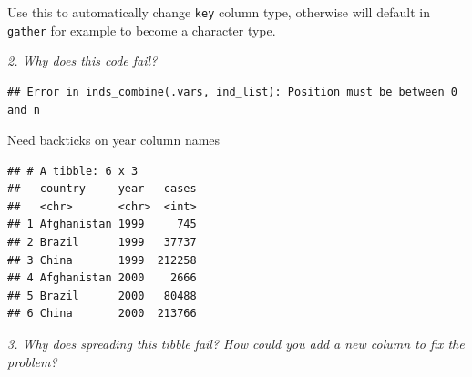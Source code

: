 \documentclass[]{book}
\newenvironment{Shaded}{\begin{snugshade}}{\end{snugshade}}
\newcommand{\DataTypeTok}[1]{\textcolor[rgb]{0.13,0.29,0.53}{#1}}
\newcommand{\DecValTok}[1]{\textcolor[rgb]{0.00,0.00,0.81}{#1}}
\newcommand{\KeywordTok}[1]{\textcolor[rgb]{0.13,0.29,0.53}{\textbf{#1}}}
\newcommand{\NormalTok}[1]{#1}
\newcommand{\OperatorTok}[1]{\textcolor[rgb]{0.81,0.36,0.00}{\textbf{#1}}}
\newcommand{\StringTok}[1]{\textcolor[rgb]{0.31,0.60,0.02}{#1}}
\theoremstyle{definition}
\theoremstyle{definition}
\theoremstyle{definition}
\theoremstyle{remark}
\begin{document}
Use this to automatically change \texttt{key} column type, otherwise
will default in \texttt{gather} for example to become a character type.

\emph{2. Why does this code fail?}

\begin{Shaded}
\end{Shaded}

\begin{verbatim}
## Error in inds_combine(.vars, ind_list): Position must be between 0 and n
\end{verbatim}

Need backticks on year column names

\begin{Shaded}
\end{Shaded}

\begin{verbatim}
## # A tibble: 6 x 3
##   country     year   cases
##   <chr>       <chr>  <int>
## 1 Afghanistan 1999     745
## 2 Brazil      1999   37737
## 3 China       1999  212258
## 4 Afghanistan 2000    2666
## 5 Brazil      2000   80488
## 6 China       2000  213766
\end{verbatim}

\emph{3. Why does spreading this tibble fail? How could you add a new
column to fix the problem?}
\end{document}
